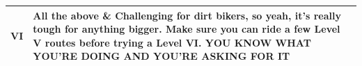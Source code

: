 \documentclass{article}
\begin{document}
\begin{minipage}[t]{0.9\linewidth}
\begin{center}
\begin{tabular}{|c|p{12cm}|}
            \hline
            \rowcolor{lightgrey}
            VI             & All the above \& Challenging for dirt bikers, so yeah, it’s really tough for anything bigger. Make sure you can ride a few Level V routes before trying a Level VI.   \textbf{YOU KNOW WHAT YOU'RE DOING AND YOU'RE ASKING FOR IT}                                                                                                                                                              \\
            \hline
        \end{tabular}
    \end{center}
\end{minipage}
\end{document}
